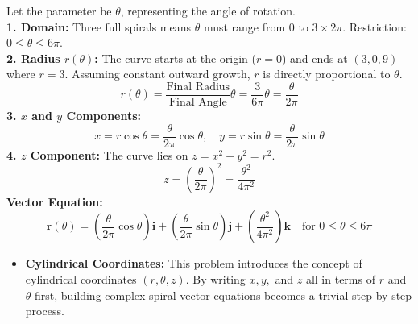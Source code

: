 \begin{solution}
Let the parameter be $\theta$, representing the angle of rotation. \\
\textbf{1. Domain:} Three full spirals means $\theta$ must range from $0$ to $3 \times 2\pi$. Restriction: $0 \le \theta \le 6\pi$. \\
\textbf{2. Radius $r(\theta)$:} The curve starts at the origin ($r=0$) and ends at $(3,0,9)$ where $r=3$. Assuming constant outward growth, $r$ is directly proportional to $\theta$. 
$$ r(\theta) = \frac{\text{Final Radius}}{\text{Final Angle}} \theta = \frac{3}{6\pi} \theta = \frac{\theta}{2\pi} $$
\textbf{3. $x$ and $y$ Components:} 
$$ x = r\cos\theta = \frac{\theta}{2\pi}\cos\theta, \quad y = r\sin\theta = \frac{\theta}{2\pi}\sin\theta $$
\textbf{4. $z$ Component:} The curve lies on $z = x^2 + y^2 = r^2$.
$$ z = \left(\frac{\theta}{2\pi}\right)^2 = \frac{\theta^2}{4\pi^2} $$
\textbf{Vector Equation:}
$$ \mathbf{r}(\theta) = \left(\frac{\theta}{2\pi}\cos\theta\right)\mathbf{i} + \left(\frac{\theta}{2\pi}\sin\theta\right)\mathbf{j} + \left(\frac{\theta^2}{4\pi^2}\right)\mathbf{k} \quad \text{for } 0 \le \theta \le 6\pi $$
\end{solution}

\begin{takeaways}
\begin{itemize}[leftmargin=*]
    \item \textbf{Cylindrical Coordinates:} This problem introduces the concept of cylindrical coordinates $(r, \theta, z)$. By writing $x, y,$ and $z$ all in terms of $r$ and $\theta$ first, building complex spiral vector equations becomes a trivial step-by-step process.
\end{itemize}
\end{takeaways}

